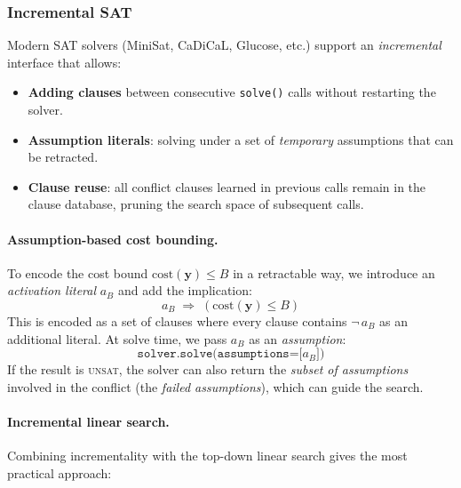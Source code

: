 \documentclass[11pt,a4paper]{article}
\begin{document}
\subsubsection{Incremental SAT}
\label{sec:opt-incremental}

Modern SAT solvers (MiniSat, CaDiCaL, Glucose, etc.) support
an \emph{incremental} interface that allows:
\begin{itemize}
  \item \textbf{Adding clauses} between consecutive \texttt{solve()}
        calls without restarting the solver.
  \item \textbf{Assumption literals}: solving under a set of
        \emph{temporary} assumptions that can be retracted.
  \item \textbf{Clause reuse}: all conflict clauses learned in
        previous calls remain in the clause database, pruning the
        search space of subsequent calls.
\end{itemize}

\paragraph{Assumption-based cost bounding.}
To encode the cost bound $\mathrm{cost}(\mathbf{y}) \le B$
in a retractable way, we introduce an \emph{activation literal}
$a_B$ and add the implication:
\begin{equation}\label{eq:activation}
  a_B \;\Rightarrow\; (\mathrm{cost}(\mathbf{y}) \le B)
\end{equation}
This is encoded as a set of clauses where every clause
contains $\neg\, a_B$ as an additional literal.
At solve time, we pass $a_B$ as an \emph{assumption}:
\[
  \texttt{solver.solve(assumptions=[}a_B\texttt{])}
\]
If the result is \textsc{unsat}, the solver can also return
the \emph{subset of assumptions} involved in the conflict
(the \emph{failed assumptions}), which can guide the search.

\paragraph{Incremental linear search.}
Combining incrementality with the top-down linear search gives
the most practical approach:
\end{document}
